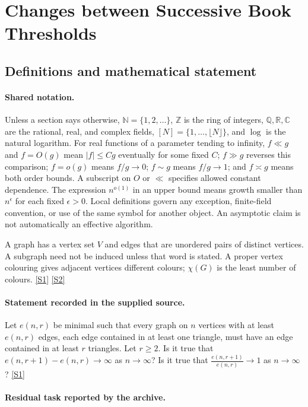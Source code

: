 \documentclass[11pt,a4paper]{article}
\newcommand{\N}{\mathbb{N}}
\newcommand{\Z}{\mathbb{Z}}
\newcommand{\Q}{\mathbb{Q}}
\newcommand{\R}{\mathbb{R}}
\newcommand{\C}{\mathbb{C}}
\newcommand{\sref}[2]{\hyperlink{source:#1:#2}{[S#2]}}
\begin{document}
\section{Changes between Successive Book Thresholds}\label{statement}


\subsection{Definitions and mathematical statement}

\paragraph{Shared notation.}Unless a section says otherwise, $\N=\{1,2,\ldots\}$,
$\Z$ is the ring of integers, $\Q,\R,\C$ are the rational, real, and complex
fields, $[N]=\{1,\ldots,\lfloor N\rfloor\}$, and $\log$ is the natural
logarithm. For real functions of a parameter tending to infinity,
$f\ll g$ and $f=O(g)$ mean $|f|\leq Cg$ eventually for some fixed $C$;
$f\gg g$ reverses this comparison; $f=o(g)$ means $f/g\to0$;
$f\sim g$ means $f/g\to1$; and $f\asymp g$ means both order bounds.
A subscript on $O$ or $\ll$ specifies allowed constant dependence.
The expression $n^{o(1)}$ in an upper bound means growth smaller than
$n^\epsilon$ for each fixed $\epsilon>0$. Local definitions govern any
exception, finite-field convention, or use of the same symbol for another
object. An asymptotic claim is not automatically an effective algorithm.



A graph has a vertex set $V$ and edges that are unordered pairs of distinct vertices. A subgraph need not be induced unless that word is stated. A proper vertex colouring gives adjacent vertices different colours; $\chi(G)$ is the least number of colours. \sref{statement}{1} \sref{statement}{2}

\paragraph{Statement recorded in the supplied source.}
Let $e(n,r)$ be minimal such that every graph on $n$ vertices with at least $e(n,r)$ edges, each edge contained in at least one triangle, must have an edge contained in at least $r$ triangles. Let $r\geq 2$. Is it true that $ e(n,r+1)-e(n,r)\to \infty $ as $n\to \infty$? Is it true that $ \frac{e(n,r+1)}{e(n,r)}\to 1 $ as $n\to \infty$? \sref{statement}{1}

\paragraph{Residual task reported by the archive.}
\end{document}
